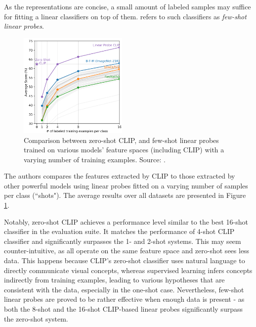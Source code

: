 \documentclass{article}
\begin{document}
\medskip
\noindent
As the representations are concise, a small amount of labeled samples may suffice for fitting a linear classifiers on top of them. \citet{radford2021clip} refers to such classifiers as \emph{few-shot linear probes}.

\begin{figure}
    \centering
    \vspace{-2mm}
    \includegraphics[width=0.47\textwidth]{figures/clip_fig6.png}
    \caption{
        Comparison between zero-shot CLIP, and few-shot linear probes trained on various models' feature spaces (including CLIP) with a varying number of training examples. Source: \citet{radford2021clip}.
    }
    \label{fig:clip_fig6}
    \vspace{-4mm}
\end{figure}

\medskip
\noindent
The authors compares the features extracted by CLIP to those extracted by other powerful models using linear probes fitted on a varying number of samples per class (``shots"). The average results over all datasets are presented in Figure \ref{fig:clip_fig6}.

\medskip
\noindent
 Notably, zero-shot CLIP achieves a performance level similar to the best 16-shot classifier in the evaluation suite. It matches the performance of 4-shot CLIP classifier and significantly surpasses the 1- and 2-shot systems. This may seem counter-intuitive, as all operate on the same feature space and zero-shot sees less data. This happens because CLIP's zero-shot classifier uses natural language to directly communicate visual concepts, whereas supervised learning infers concepts indirectly from training examples, leading to various hypotheses that are consistent with the data, especially in the one-shot case. Nevertheless, few-shot linear probes are proved to be rather effective when enough data is present - as both the 8-shot and the 16-shot CLIP-based linear probes significantly surpass the zero-shot system.
\end{document}
